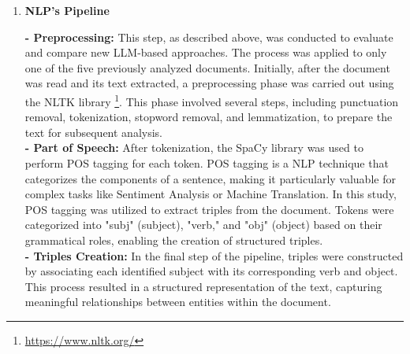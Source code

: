 \documentclass[runningheads]{llncs}
\begin{document}
\begin{enumerate}
\item \textbf{NLP's Pipeline}

\textbf{- Preprocessing:} This step, as described above, was conducted to evaluate and compare new LLM-based approaches. The process was applied to only one of the five previously analyzed documents. Initially, after the document was read and its text extracted, a preprocessing phase was carried out using the NLTK library \footnote{\url{https://www.nltk.org/}}. This phase involved several steps, including punctuation removal, tokenization, stopword removal, and lemmatization, to prepare the text for subsequent analysis.\\
\textbf{- Part of Speech:} After tokenization, the SpaCy library was used to perform POS tagging for each token. POS tagging is a NLP technique that categorizes the components of a sentence, making it particularly valuable for complex tasks like Sentiment Analysis or Machine Translation. In this study, POS tagging was utilized to extract triples from the document. Tokens were categorized into "subj" (subject), "verb," and "obj" (object) based on their grammatical roles, enabling the creation of structured triples.\\
\textbf{- Triples Creation:} In the final step of the pipeline, triples were constructed by associating each identified subject with its corresponding verb and object. This process resulted in a structured representation of the text, capturing meaningful relationships between entities within the document.

\end{enumerate}
\end{document}
